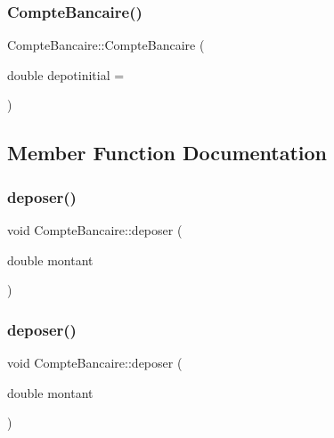 \subsubsection{\texorpdfstring{Compte\+Bancaire()}{CompteBancaire()}\hspace{0.1cm}{\footnotesize\ttfamily [4/4]}}
{\footnotesize\ttfamily Compte\+Bancaire\+::\+Compte\+Bancaire (\begin{DoxyParamCaption}\item[{double}]{depotinitial = {} }\end{DoxyParamCaption})}



\subsection{Member Function Documentation}
\mbox{\label{classCompteBancaire_a65eb7dd2d4c777f5cf78c0021d7490f3}} 
\subsubsection{\texorpdfstring{deposer()}{deposer()}\hspace{0.1cm}{\footnotesize\ttfamily [1/2]}}
{\footnotesize\ttfamily void Compte\+Bancaire\+::deposer (\begin{DoxyParamCaption}\item[{double}]{montant }\end{DoxyParamCaption})}

\mbox{\label{classCompteBancaire_a65eb7dd2d4c777f5cf78c0021d7490f3}} 
\subsubsection{\texorpdfstring{deposer()}{deposer()}\hspace{0.1cm}{\footnotesize\ttfamily [2/2]}}
{\footnotesize\ttfamily void Compte\+Bancaire\+::deposer (\begin{DoxyParamCaption}\item[{double}]{montant }\end{DoxyParamCaption})}

\mbox{\label{classCompteBancaire_a6ed81e6f30e6d8d31f5c3ffe7f9755c4}} 

